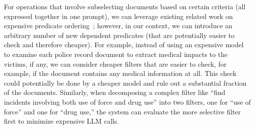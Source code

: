  
For operations that involve subselecting documents
based on certain criteria (all expressed
together in one prompt), we can leverage existing
related work on expensive predicate ordering~\cite{hellerstein1993predicate, raman1999online};
however, in our context, we can introduce an arbitrary
number of new dependent predicates (that are potentially easier
to check and therefore cheaper).
For example, instead of using an expensive model
to examine each police record document to extract
medical impacts to the victims, if any,
we can consider cheaper filters
that are easier to check, for example, 
if the document contains any medical information at all.
This check could potentially be done by a cheaper
model and rule out a substantial fraction of the documents.
Similarly, when decomposing a complex filter like ``find 
incidents involving both use of force and drug use'' into two 
filters, one for ``use of force'' and one for ``drug use,'' the 
system can evaluate the more selective filter first to minimize expensive LLM calls.


























